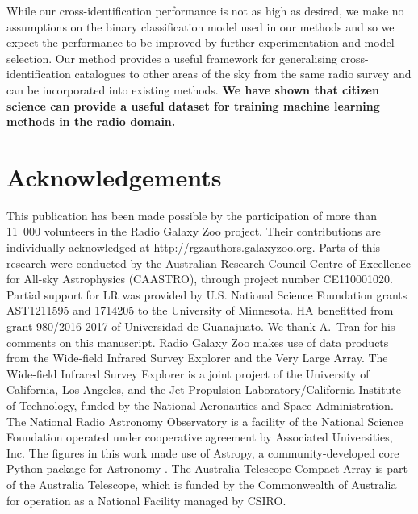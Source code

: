 \documentclass[fleqn,usenatbib,usedcolumn]{mnras}
\newcommand{\edited}[1]{{\bf {#1}}}
\begin{document}
  While our cross-identification performance is not as high as desired, we
  make no assumptions on the binary classification model used in our methods
  and so we expect the performance to be improved by further experimentation
  and model selection. Our method provides a useful framework for generalising
  cross-identification catalogues to other areas of the sky from the same
  radio survey and can be incorporated into existing methods. \edited{We have
  shown that citizen science can provide a useful dataset for training machine
  learning methods in the radio domain.}

\section{Acknowledgements}

  This publication has been made possible by the participation of more than
  11~000 volunteers in the Radio Galaxy Zoo project. Their contributions are
  individually acknowledged at \url{http://rgzauthors.galaxyzoo.org}. Parts of
  this research were conducted by the Australian Research Council Centre of
  Excellence for All-sky Astrophysics (CAASTRO), through project number
  CE110001020. Partial support for LR was provided by U.S. National Science
  Foundation grants AST1211595 and 1714205 to the University of Minnesota. HA
  benefitted from grant 980/2016-2017 of Universidad de Guanajuato. We thank
  A.~Tran for his comments on this manuscript. Radio Galaxy Zoo makes use of
  data products from the Wide-field Infrared Survey Explorer and the Very
  Large Array. The Wide-field Infrared Survey Explorer is a joint project of
  the University of California, Los Angeles, and the Jet Propulsion
  Laboratory/California Institute of Technology, funded by the National
  Aeronautics and Space Administration. The National Radio Astronomy
  Observatory is a facility of the National Science Foundation operated under
  cooperative agreement by Associated Universities, Inc. The figures
  in this work made use of Astropy, a community-developed core Python package
  for Astronomy \citep{astropy}. The Australia Telescope Compact Array is part
  of the Australia Telescope, which is funded by the Commonwealth of Australia
  for operation as a National Facility managed by CSIRO.

%



\end{document}
